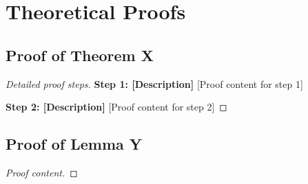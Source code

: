 \section{Theoretical Proofs}
\label{app:proofs}


\subsection{Proof of Theorem X}
\label{app:proof-theorem-x}

\begin{theorem}
\end{theorem}

\begin{proof}
[Detailed proof steps]

\noindent \textbf{Step 1: [Description]}
[Proof content for step 1]

\noindent \textbf{Step 2: [Description]}
[Proof content for step 2]

\end{proof}

\subsection{Proof of Lemma Y}
\label{app:proof-lemma-y}

\begin{lemma}
\end{lemma}

\begin{proof}
[Proof content]
\end{proof}


